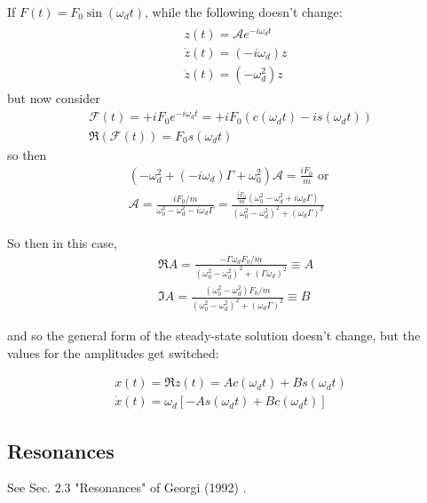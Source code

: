 If $F(t) = F_0 \sin{(\omega_d t)}$, while the following doesn't change:
\[
\begin{gathered}
	\begin{aligned}
		& z(t) = \mathcal{A} e^{-i\omega_d t} \\
		& \dot{z}(t) = (-i \omega_d) z \\
		& \ddot{z}(t) = (-\omega_d^2)z
	\end{aligned}
\end{gathered}
\]
but now consider 
\[
\begin{gathered}
	\mathcal{F}(t) = + i F_0 e^{-i\omega_d t} = +i F_0 (c(\omega_d t)  -i s(\omega_d t) ) \\
	\Re{(\mathcal{F}(t) )} = F_0 s(\omega_dt)
\end{gathered}
\]
so then
\[
\begin{gathered}
	(-\omega_d^2 + (-i \omega_d)\Gamma + \omega_0^2)\mathcal{A} = \frac{iF_0}{m}  \text{ or } 	\\
	\mathcal{A} = \frac{ iF_0 / m }{ \omega_0^2 - \omega_d^2- i\omega_d \Gamma} = \frac{ \frac{iF_0}{m} (\omega_0^2 - \omega_d^2 + i \omega_d \Gamma  )}{ (\omega_0^2 - \omega_d^2)^2 + (\omega_d \Gamma)^2 }
\end{gathered}
\]

So then in this case, 
\begin{equation}\label{agat:Eq:AmplitudeValuesForcedOscillationsForceProportionalToSine}
	\begin{aligned}
		& \Re{A} = \frac{ -\Gamma \omega_d F_0 /m }{ (\omega_0^2 - \omega_d^2)^2 + (\Gamma \omega_d )^2 } \equiv A \\
		& \Im{A} = \frac{ (\omega_0^2 - \omega_d^2) F_0/m }{(\omega_0^2 - \omega_d^2)^2 + (\omega_d \Gamma)^2} \equiv B 
	\end{aligned}
\end{equation}

and so the general form of the steady-state solution doesn't change, but the values for the amplitudes get switched:

\[
\begin{gathered}
	x(t) = \Re{ z(t)} = Ac(\omega_d t) + Bs(\omega_dt) \\
	\dot{x}(t) = \omega_d \left[ -A s(\omega_dt) + Bc(\omega_dt) \right]
\end{gathered}
\]

\subsection{Resonances} See Sec. 2.3 "Resonances" of Georgi (1992) \cite{agat:Geor1992}.

